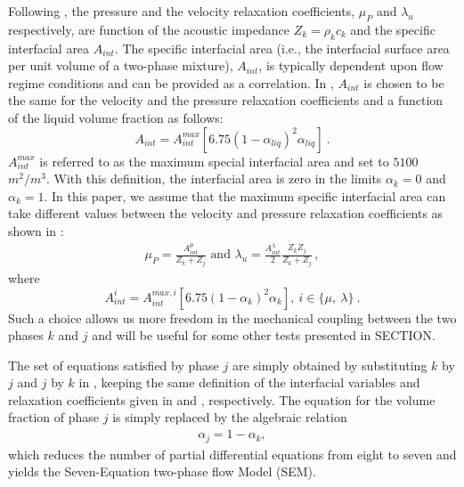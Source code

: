 \documentclass[preprint,10pt]{elsarticle}
\begin{document}
Following \cite{SEM}, the pressure and the velocity relaxation coefficients, $\mu_P$  and $\lambda_u$ respectively, are function of the acoustic 
impedance $Z_k = \rho_k c_k$ and the specific interfacial area $A_{int}$. The specific interfacial area (i.e., the interfacial surface area per unit
volume of a two-phase mixture), $A_{int}$, is typically dependent upon flow regime conditions and can be provided as a correlation. In \cite{SEM}, $A_{int}$ is chosen to be the same for the velocity and the pressure relaxation coefficients and a function of the liquid volume fraction as follows:
%
\begin{equation}
A_{int} = A_{int}^{max} \left[ 6.75 \left(1-\alpha_{liq} \right)^2 \alpha_{liq} \right] \ . \nonumber
\end{equation}
% 
$A_{int}^{max}$ is referred to as the maximum special interfacial area and set to $5100$ $m^2 / m^3$. With this definition, the interfacial area is zero in the limits $\alpha_{k} = 0$ and $\alpha_{k} = 1$.
In this paper, we assume that the maximum specific interfacial area can take different values between the velocity and pressure relaxation coefficients as shown in :
%
\begin{subequations}
\label{eq:relaxation_coeff}
\begin{align}
  \label{E-R:86}
  \mu_P = \frac{A_{int}^\mu}{Z_{k}+Z_{j}} 
  \text{ and }
  \lambda_u = \frac{A_{int}^\lambda}{2}  \frac{Z_{k} Z_{j}}{Z_{k}+Z_{j}} \, ,
\end{align}
\end{subequations}
%
where
%
\begin{equation}\label{eq:Aint-sect4}
A_{int}^i = A_{int}^{max,i} \left[ 6.75 \left(1-\alpha_{k} \right)^2 \alpha_{k} \right] , \ i \in \{ \mu, \ \lambda \} \ .
\end{equation}
%
Such a choice allows us more freedom in the mechanical coupling between the two phases $k$ and $j$ and will be useful for some other tests presented in SECTION.

The set of equations satisfied by phase $j$ are simply obtained by substituting $k$ by $j$ and $j$ by $k$ in , keeping 
the same definition of the interfacial variables and relaxation coefficients given in  and , respectively. The equation for the volume fraction of phase $j$ is simply replaced by the algebraic relation
%
\begin{align}
 \alpha_{j}= 1 - \alpha_{k}, \nonumber
\end{align}
%
which reduces the number of partial differential equations from eight to seven and yields the Seven-Equation two-phase flow Model (SEM).
\end{document}
